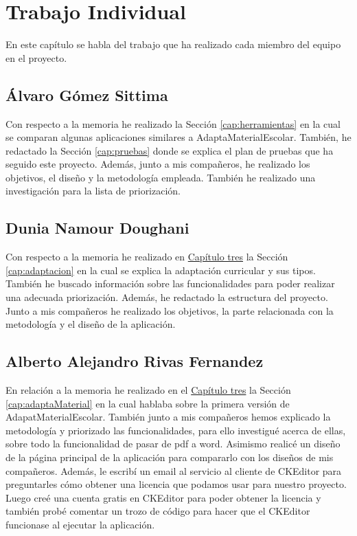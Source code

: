 \chapter{Trabajo Individual}
\label{cap:TrabajoIndividual}

En este capítulo se habla del trabajo que ha realizado cada miembro del equipo en el proyecto.

\section{Álvaro Gómez Sittima}
Con respecto a la memoria he realizado la Sección \ref{cap:herramientas} en la cual se comparan algunas aplicaciones similares a AdaptaMaterialEscolar. También, he redactado la Sección \ref{cap:pruebas} donde se explica el plan de pruebas que ha seguido este proyecto. Además, junto a mis compañeros, he realizado los objetivos, el diseño y la metodología empleada. También he realizado una investigación para la lista de priorización.

\section{Dunia Namour Doughani}
Con respecto a la memoria he realizado en {\hyperref[cap:estadoDelArte]{Capítulo tres}} la Sección \ref{cap:adaptacion} en la cual se explica la adaptación curricular y sus tipos. También he buscado información sobre las funcionalidades para poder realizar una adecuada priorización. Además, he redactado la estructura del proyecto. Junto a mis compañeros he realizado los objetivos, la parte relacionada con la metodología y el diseño de la aplicación.

\section{Alberto Alejandro Rivas Fernandez}
En relación a la memoria he realizado en el {\hyperref[cap:estadoDelArte]{Capítulo tres}} la Sección \ref{cap:adaptaMaterial} en la cual hablaba sobre la primera versión de AdapatMaterialEscolar. También junto a mis compañeros hemos explicado la metodología y priorizado las funcionalidades, para ello investigué acerca de ellas, sobre todo la funcionalidad de pasar de pdf a word. Asimismo realicé un diseño de la página principal de la aplicación para compararlo con los diseños de mis compañeros. Además, le escribí un email al servicio al cliente de CKEditor para preguntarles cómo obtener una licencia que podamos usar para nuestro proyecto. Luego creé una cuenta gratis en CKEditor para poder obtener la licencia y también probé comentar un trozo de código para hacer que el CKEditor funcionase al ejecutar la aplicación.


